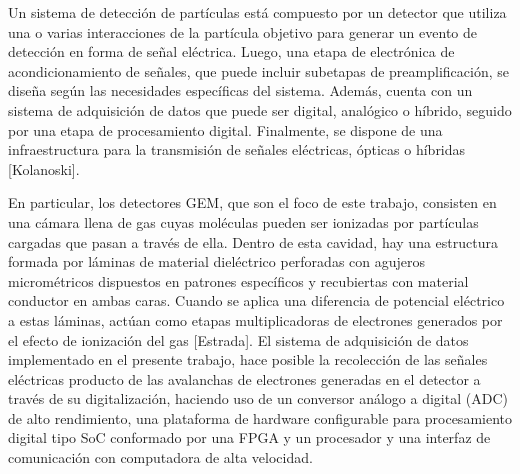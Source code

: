 \documentclass[]{book}
\begin{document}
\noindent Un sistema de detección de partículas está compuesto por un detector que utiliza una o varias interacciones de la partícula objetivo para generar un evento de detección en forma de señal eléctrica. Luego, una etapa de electrónica de acondicionamiento de señales, que puede incluir subetapas de preamplificación, se diseña según las necesidades específicas del sistema. Además, cuenta con un sistema de adquisición de datos que puede ser digital, analógico o híbrido, seguido por una etapa de procesamiento digital. Finalmente, se dispone de una infraestructura para la transmisión de señales eléctricas, ópticas o híbridas [Kolanoski].

\noindent En particular, los detectores GEM, que son el foco de este trabajo, consisten en una cámara llena de gas cuyas moléculas pueden ser ionizadas por partículas cargadas que pasan a través de ella. Dentro de esta cavidad, hay una estructura formada por láminas de material dieléctrico perforadas con agujeros micrométricos dispuestos en patrones específicos y recubiertas con material conductor en ambas caras. Cuando se aplica una diferencia de potencial eléctrico a estas láminas, actúan como etapas multiplicadoras de electrones generados por el efecto de ionización del gas [Estrada]. El sistema de adquisición de datos implementado en el presente trabajo, hace posible la recolección de las señales eléctricas producto de las avalanchas de electrones generadas en el detector a través de su digitalización, haciendo uso de un conversor análogo a digital (ADC) de alto rendimiento, una plataforma de hardware configurable para procesamiento digital tipo SoC conformado por una FPGA y un procesador y una interfaz de comunicación con computadora de alta velocidad. 
\end{document}
